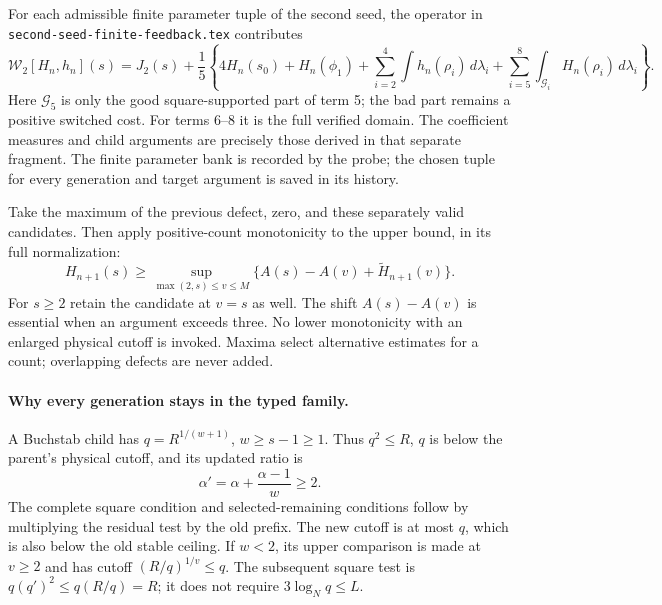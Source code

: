 \documentclass[11pt]{article}
\begin{document}
For each admissible finite parameter tuple of the second seed, the
operator in \texttt{second-seed-finite-feedback.tex} contributes
\[
 \mathcal W_2[H_n,h_n](s)=J_2(s)+\frac15
 \left\{4H_n(s_0)+H_n(\phi_1)
       +\sum_{i=2}^4\int h_n(\rho_i)\,d\lambda_i
       +\sum_{i=5}^8\int_{\mathcal G_i}H_n(\rho_i)\,d\lambda_i
 \right\}.
\]
Here $\mathcal G_5$ is only the good square-supported part of term 5;
the bad part remains a positive switched cost. For terms 6--8 it is
the full verified domain. The coefficient measures and child
arguments are precisely those derived in that separate fragment.
The finite parameter bank is recorded by the probe; the chosen tuple
for every generation and target argument is saved in its history.

Take the maximum of the previous defect, zero, and these separately
valid candidates. Then apply positive-count monotonicity to the
upper bound, in its full normalization:
\[
 H_{n+1}(s)\ge
 \sup_{\max(2,s)\le v\le M}
       \{A(s)-A(v)+\widetilde H_{n+1}(v)\}.
\]
For $s\ge2$ retain the candidate at $v=s$ as well. The shift
$A(s)-A(v)$ is essential when an argument exceeds three. No lower
monotonicity with an enlarged physical cutoff is invoked. Maxima
select alternative estimates for a count; overlapping defects are
never added.

\paragraph{Why every generation stays in the typed family.}
A Buchstab child has $q=R^{1/(w+1)}$, $w\ge s-1\ge1$.
Thus $q^2\le R$, $q$ is below the parent's physical cutoff, and
its updated ratio is
\[
 \alpha' =\alpha+\frac{\alpha-1}{w}\ge2.
\]
The complete square condition and selected-remaining conditions
follow by multiplying the residual test by the old prefix.
The new cutoff is at most $q$, which is also below the old stable
ceiling. If $w<2$, its upper comparison is made at $v\ge2$ and
has cutoff $(R/q)^{1/v}\le q$. The subsequent square test is
$q(q')^2\le q(R/q)=R$; it does not require $3\log_Nq\le L$.
\end{document}
